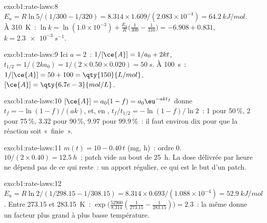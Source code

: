 \begin{solution}{exo:b1:rate-laws:8}
$E_a = R\ln5/(1/300 - 1/320) = 8.314 \times 1.609/(2.083 \times 10^{-4}) =
\qty{64.2}{kJ/mol}$. À \qty{310}{K}~: $\ln k = \ln(1.0 \times 10^{-3}) +
\frac{E_a}{R}\big(\frac{1}{300} - \frac{1}{310}\big) = -6.908 + 0.831$,
$k = \qty{2.3e-3}{s^{-1}}$.
\end{solution}

\begin{solution}{exo:b1:rate-laws:9}
Ici $a = 2$~: $1/[\ce{A}] = 1/a_0 + 2kt$, $t_{1/2} = 1/(2k a_0) = 1/(2
\times 0.50 \times 0.020) = \qty{50}{s}$. À \qty{100}{s}~: $1/[\ce{A}] = 50
+ 100 = \qty{150}{L/mol}$, $[\ce{A}] = \qty{6.7e-3}{mol/L}$.
\end{solution}

\begin{solution}{exo:b1:rate-laws:10}
$[\ce{A}] = a_0(1 - f) = a_0\eu^{-akt_f}$ donne $t_f = -\ln(1-f)/(ak)$,
et, en , $t_f/t_{1/2} = -\ln(1-f)/\ln2$~: 1 pour
50\,\%, 2 pour 75\,\%, 3.32 pour 90\,\%, 9.97 pour 99.9\,\%~: il faut
environ dix  pour que la réaction soit «~finie~».
\end{solution}

\begin{solution}{exo:b1:rate-laws:11}
$m(t) = 10 - 0.40\,t$ (\unit{mg}, \unit{h})~: ordre 0.  $10/(2 \times 0.40) = \qty{12.5}{h}$~; patch vide au bout
de \qty{25}{h}. La dose délivrée par heure ne dépend pas de ce qui
reste~: un apport régulier, ce qui est le but d'un patch.
\end{solution}

\begin{solution}{exo:b1:rate-laws:12}
$E_a = R\ln2/(1/298.15 - 1/308.15) = 8.314 \times 0.693/(1.088 \times
10^{-4}) = \qty{52.9}{kJ/mol}$. Entre 273.15 et \qty{283.15}{K}~:
$\exp\big(\frac{52900}{8.314}(\frac{1}{273.15} - \frac{1}{283.15})\big) =
2.3$~: la même  donne un facteur plus grand à plus
basse température.
\end{solution}

